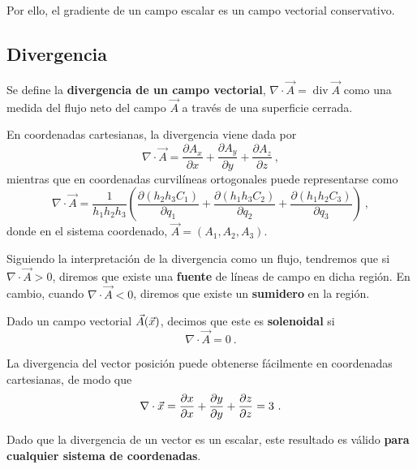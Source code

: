 Por ello, el gradiente de un campo escalar es un campo vectorial conservativo.

\subsection{Divergencia}

\begin{defi}
    Se define la \textbf{divergencia de un campo vectorial}, $\nabla \cdot \vec{A} = \operatorname{div} \vec{A}$ como una medida del flujo neto del campo $\vec{A}$ a través de una superficie cerrada.
\end{defi}

En coordenadas cartesianas, la divergencia viene dada por
\begin{equation}
    \nabla \cdot \vec{A} = \frac{\partial A_x}{\partial x} + \frac{\partial A_y}{\partial y} + \frac{\partial A_z}{\partial z} \ ,
\end{equation}
mientras que en coordenadas curvilíneas ortogonales puede representarse como 
\begin{equation}
    \nabla \cdot \vec{A} = \frac{1}{h_1 h_2 h_3} \left( \frac{\partial(h_2 h_3 C_1)}{\partial q_1} + \frac{\partial(h_1 h_3 C_2)}{\partial q_2} + \frac{\partial(h_1 h_2 C_3)}{\partial q_3} \right) \ ,
\end{equation}
donde en el sistema coordenado, $\vec{A} = (A_1, A_2, A_3)$.

Siguiendo la interpretación de la divergencia como un flujo, tendremos que si $\nabla \cdot \vec{A} > 0$, diremos que existe una \textbf{fuente} de líneas de campo en dicha región. En cambio, cuando $\nabla \cdot \vec{A} < 0$, diremos que existe un \textbf{sumidero} en la región.

\begin{defi}
    Dado un campo vectorial $\vec{A}(\vec{x})$, decimos que este es \textbf{solenoidal} si 
    \begin{equation}
        \nabla \cdot \vec{A} = 0 \ .
    \end{equation}
\end{defi}

\begin{ejemplo}
    La divergencia del vector posición puede obtenerse fácilmente en coordenadas cartesianas, de modo que 
    \begin{equation}
        \nabla \cdot \vec{x} = \frac{\partial x}{\partial x} + \frac{\partial y}{\partial y} + \frac{\partial z}{\partial z} = 3 \ .
    \end{equation}

    Dado que la divergencia de un vector es un escalar, este resultado es válido \textbf{para cualquier sistema de coordenadas}.
\end{ejemplo}

